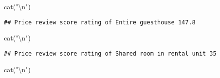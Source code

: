 \documentclass[
]{article}
\newenvironment{Shaded}{\begin{snugshade}}{\end{snugshade}}
\newcommand{\FunctionTok}[1]{\textcolor[rgb]{0.00,0.00,0.00}{#1}}
\newcommand{\NormalTok}[1]{#1}
\newcommand{\OtherTok}[1]{\textcolor[rgb]{0.56,0.35,0.01}{#1}}
\newcommand{\SpecialCharTok}[1]{\textcolor[rgb]{0.00,0.00,0.00}{#1}}
\newcommand{\StringTok}[1]{\textcolor[rgb]{0.31,0.60,0.02}{#1}}
\begin{document}
\begin{Shaded}
\begin{Highlighting}[]
\FunctionTok{cat}\NormalTok{(}\StringTok{"}\SpecialCharTok{\textbackslash{}n}\StringTok{"}\NormalTok{)}
\end{Highlighting}
\end{Shaded}

\begin{Shaded}
\end{Shaded}

\begin{verbatim}
## Price review score rating of Entire guesthouse 147.8
\end{verbatim}

\begin{Shaded}
\begin{Highlighting}[]
\FunctionTok{cat}\NormalTok{(}\StringTok{"}\SpecialCharTok{\textbackslash{}n}\StringTok{"}\NormalTok{)}
\end{Highlighting}
\end{Shaded}

\begin{Shaded}
\end{Shaded}

\begin{verbatim}
## Price review score rating of Shared room in rental unit 35
\end{verbatim}

\begin{Shaded}
\begin{Highlighting}[]
\FunctionTok{cat}\NormalTok{(}\StringTok{"}\SpecialCharTok{\textbackslash{}n}\StringTok{"}\NormalTok{)}
\end{Highlighting}
\end{Shaded}
\end{document}
